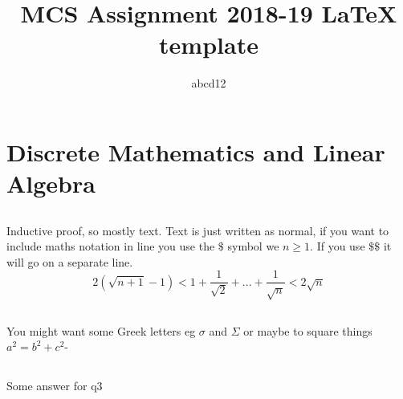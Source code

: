 \documentclass[]{article}
\title{MCS Assignment 2018-19 LaTeX template}
\author{abcd12} %
\begin{document}
\maketitle


\section{Discrete Mathematics and Linear Algebra}
\subsection{}
Inductive proof, so mostly text. Text is just written as normal, if you want to include maths notation in line you use the $\$$ symbol we $n\geq 1$.
If you use $\$\$$ it will go on a separate line. $$2(\sqrt{n+1}-1)<1 + \frac{1}{\sqrt{2}} + ... + \frac{1}{\sqrt{n}} < 2\sqrt{n}$$
\subsection{}
You might want some Greek letters eg $\sigma$ and $\Sigma$ or maybe to square things $a^{2} = b^{2} +c^{2}$-
\subsection{}
Some answer for q3
\end{document}
